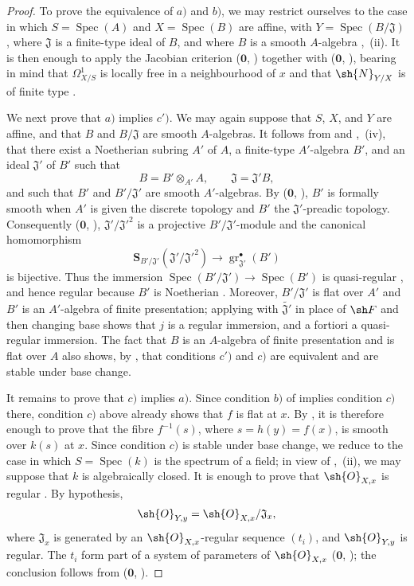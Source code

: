 \begin{proof}
To prove the equivalence of $a)$ and $b)$, we may restrict ourselves to the case in which $S=\operatorname{Spec}(A)$ and $X=\operatorname{Spec}(B)$ are affine, with
$Y=\operatorname{Spec}(B/\mathfrak J)$, where $\mathfrak J$ is a finite-type ideal of $B$, and where $B$ is a smooth $A$-algebra ,~(ii).
It is then enough to apply the Jacobian criterion ($\mathbf{0}$, ) together with ($\mathbf{0}$, ), bearing in mind that $\Omega^1_{X/S}$ is locally free in a neighbourhood of $x$ and that $\sh{N}_{Y/X}$ is of finite type .

We next prove that $a)$ implies $c')$.
We may again suppose that $S$, $X$, and $Y$ are affine, and that $B$ and $B/\mathfrak J$ are smooth $A$-algebras.
It follows from  and ,~(iv), that there exist a Noetherian subring $A'$ of $A$, a finite-type $A'$-algebra $B'$, and an ideal $\mathfrak J'$ of $B'$ such that
\[
  B=B'\otimes_{A'}A,\qquad \mathfrak J=\mathfrak J'B,
\]
and such that $B'$ and $B'/\mathfrak J'$ are smooth $A'$-algebras.
By ($\mathbf{0}$, ), $B'$ is formally smooth when $A'$ is given the discrete topology and $B'$ the $\mathfrak J'$-preadic topology.
Consequently ($\mathbf{0}$, ), $\mathfrak J'/\mathfrak J'^2$ is a projective $B'/\mathfrak J'$-module and the canonical homomorphism
\[
  \mathbf{S}_{B'/\mathfrak J'}(\mathfrak J'/\mathfrak J'^2)
  \longrightarrow \operatorname{gr}^{\bullet}_{\mathfrak J'}(B')
\]
is bijective.
Thus the immersion $\operatorname{Spec}(B'/\mathfrak J')\to\operatorname{Spec}(B')$ is quasi-regular , and hence regular because $B'$ is Noetherian .
Moreover, $B'/\mathfrak J'$ is flat over $A'$  and $B'$ is an $A'$-algebra of finite presentation; applying  with $\widetilde{\mathfrak J'}$ in place of $\sh F$ and then changing base shows that $j$ is a regular immersion, and a fortiori a quasi-regular immersion.
The fact that $B$ is an $A$-algebra of finite presentation and is flat over $A$ also shows, by , that conditions $c')$ and $c)$ are equivalent and are stable under base change.

It remains to prove that $c)$ implies $a)$.
Since condition $b)$ of  implies condition $c)$ there, condition $c)$ above already shows that $f$ is flat at $x$.
By , it is therefore enough to prove that the fibre $f^{-1}(s)$, where $s=h(y)=f(x)$, is smooth over $k(s)$ at $x$.
Since condition $c)$ is stable under base change, we reduce to the case in which $S=\operatorname{Spec}(k)$ is the spectrum of a field; in view of ,~(ii), we may suppose that $k$ is algebraically closed.
It is enough to prove that $\sh{O}_{X,x}$ is regular .
By hypothesis,
\[
  \sh{O}_{Y,y}=\sh{O}_{X,x}/\mathfrak J_x,
\]
where $\mathfrak J_x$ is generated by an $\sh{O}_{X,x}$-regular sequence $(t_i)$, and $\sh{O}_{Y,y}$ is regular.
The $t_i$ form part of a system of parameters of $\sh{O}_{X,x}$ ($\mathbf{0}$, ); the conclusion follows from ($\mathbf{0}$, ).
\end{proof}

